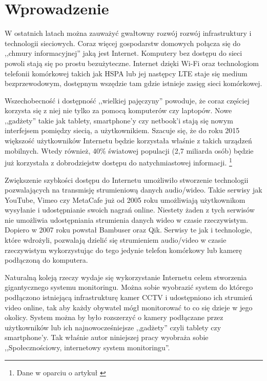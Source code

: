 \chapter{Wprowadzenie}
\label{cha:wprowadzenie}

W ostatnich latach można zauważyć gwałtowny rozwój rozwój infrastruktury i technologii sieciowych. Coraz więcej gospodarstw domowych połącza się do ,,chmury informacyjnej'' jaką jest Internet. Komputery bez dostępu do sieci powoli stają się po prostu bezużyteczne. Internet dzięki Wi-Fi oraz technologiom telefonii komórkowej takich jak HSPA lub jej następcy LTE staje się medium bezprzewodowym, dostępnym wszędzie tam gdzie istnieje zasięg sieci komórkowej.

Wszechobecność i dostępność ,,wielkiej pajęczyny'' powoduje, że coraz częściej korzysta się z niej nie tylko za pomocą komputerów czy laptopów. Nowe ,,gadżety'' takie jak tablety, smartphone'y czy netbook'i stają się nowym interfejsem pomiędzy siecią, a użytkownikiem. Szacuje się, że do roku 2015 większość użytkowników Internetu będzie korzystała właśnie z takich urządzeń mobilnych. Wtedy również, 40\% światowej populacji (2,7 miliarda osób) będzie już korzystała z dobrodziejstw dostępu do natychmiastowej informacji. \footnote{Dane w oparciu o  artykuł \cite{Kim11}}

Zwiększenie szybkości dostępu do Internetu umożliwiło stworzenie technologii pozwalających na transmisję strumieniową danych audio/wideo. Takie serwisy jak YouTube, Vimeo czy MetaCafe już od 2005 roku umożliwiają użytkownikom wysyłanie i udostępnianie swoich nagrań online. Niestety żaden z tych serwisów nie umożliwia udostępniania strumienia danych wideo w czasie rzeczywistym. Dopiero w 2007 roku powstał Bambuser oraz Qik. Serwisy te jak i technologie, które wdrożyli, pozwalają dzielić się strumieniem audio/video w czasie rzeczywistym wykorzystując do tego jedynie telefon komórkowy lub kamerę podłączoną do komputera.

Naturalną koleją rzeczy wydaje się wykorzystanie Internetu celem stworzenia gigantycznego systemu monitoringu. Można sobie wyobrazić system do którego podłączono istniejącą infrastrukturę kamer CCTV i udostępniono ich strumień video online, tak aby każdy obywatel mógł monitorować to co się dzieje w jego okolicy. System można by było rozszerzyć o kamery podłączane przez użytkowników lub ich najnowocześniejsze ,,gadżety'' czyli tablety czy smartphone'y. Tak właśnie autor niniejszej pracy wyobraża sobie ,,Społecznościowy, internetowy system monitoringu''.

